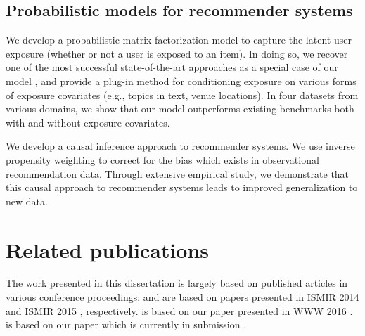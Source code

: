 \subsection{Probabilistic models for recommender systems}
We develop a probabilistic matrix factorization model to capture the latent user exposure (whether or not a user is exposed to an item). In doing so, we recover one of the most successful state-of-the-art approaches as a special case of our model
\citep{hu2008collaborative}, and provide a plug-in method for conditioning
exposure on various forms of exposure covariates (e.g., topics in text,
venue locations). In four datasets from various domains, we show that our model
outperforms existing benchmarks both with and
without exposure covariates. 

We develop a causal inference approach to recommender systems. 
We use inverse propensity weighting to correct for the bias which exists in observational recommendation data. Through extensive empirical study, we demonstrate that this causal approach to recommender systems leads to improved generalization to new data.


\section{Related publications}

The work presented in this dissertation is largely based on published articles in various conference proceedings:  and  are based on papers presented in ISMIR 2014 \citep{liang2014codebook} and ISMIR 2015 \citep{liang15content}, respectively.  is based on our paper presented in WWW 2016 \citep{Liang16exposure}.  is based on our paper which is currently in submission \citep{liang16causal}.